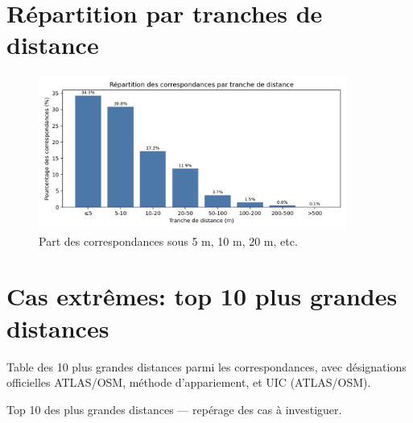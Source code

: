 \section{Répartition par tranches de distance}

\begin{figure}[H]
    \centering
    \includegraphics[width=0.9\textwidth]{../figures/chap5/distance_coverage_buckets.png}
    \caption[Tranches de distance]{Part des correspondances sous 5 m, 10 m, 20 m, etc.}
\end{figure}

\section{Cas extrêmes: top 10 plus grandes distances}

Table des 10 plus grandes distances parmi les correspondances, avec désignations officielles ATLAS/OSM, méthode d'appariement, et UIC (ATLAS/OSM).

\begin{table}[H]
    \centering
    
    \caption[Top 10 distances]{Top 10 des plus grandes distances — repérage des cas à investiguer.}
\end{table}
